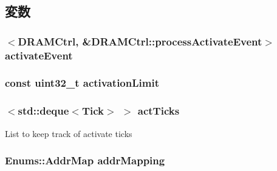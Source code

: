 \subsection{変数}
\hypertarget{classDRAMCtrl_ad15dbdabb028b909655b32ab9e322e50}{
\subsubsection[{activateEvent}]{$<${\bf DRAMCtrl}, \&DRAMCtrl::processActivateEvent$>$ {\bf activateEvent}}}
\label{classDRAMCtrl_ad15dbdabb028b909655b32ab9e322e50}
\hypertarget{classDRAMCtrl_aba56ec7c49633bf73f29b24ff6a18b38}{
\subsubsection[{activationLimit}]{\setlength{\rightskip}{0pt plus 5cm}const {\bf uint32\_\-t} {\bf activationLimit}}}
\label{classDRAMCtrl_aba56ec7c49633bf73f29b24ff6a18b38}
\hypertarget{classDRAMCtrl_a4a4e224ac2ca35b6d47a3ff850e1ff3e}{
\subsubsection[{actTicks}]{$<${\bf std::deque}$<${\bf Tick}$>$ $>$ {\bf actTicks}}}
\label{classDRAMCtrl_a4a4e224ac2ca35b6d47a3ff850e1ff3e}
List to keep track of activate ticks \hypertarget{classDRAMCtrl_a39c22fc32946a97479fd50b6d4db1ed0}{
\subsubsection[{addrMapping}]{\setlength{\rightskip}{0pt plus 5cm}Enums::AddrMap {\bf addrMapping}}}
\label{classDRAMCtrl_a39c22fc32946a97479fd50b6d4db1ed0}
